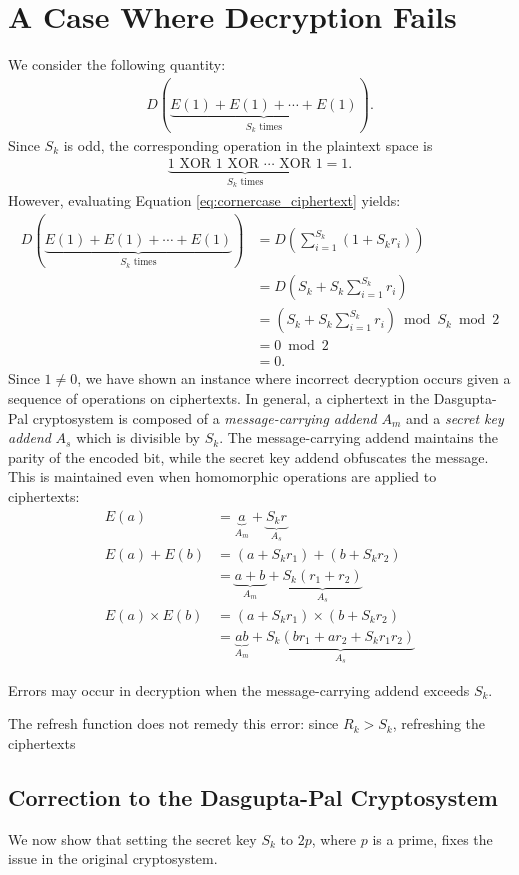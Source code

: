 \section{A Case Where Decryption Fails}
We consider the following quantity:
\begin{align}
	\label{eq:cornercase_ciphertext}
	D(\underbrace{E(1)+E(1)+\cdots+E(1)}_{S_k \text{ times}}).
\end{align}
Since $S_k$ is odd, the corresponding operation in the plaintext space is
\begin{align*}
	\label{eq:cornercase_plaintext}
	\underbrace{1 \text{ XOR } 1 \text{ XOR } \cdots \text{ XOR } 1}_{S_k \text{ times}} = 1.
\end{align*}
However, evaluating Equation \ref{eq:cornercase_ciphertext} yields:
\begin{align*}
	D(\underbrace{E(1)+E(1)+\cdots+E(1)}_{S_k \text{ times}})
	&= D\left(\sum_{i=1}^{S_k}{(1+S_kr_i)}\right)\\
	&= D\left(S_k + S_k\sum_{i=1}^{S_k}{r_i}\right)\\
	&= \left(S_k + S_k\sum_{i=1}^{S_k}{r_i}\right) \bmod S_k \bmod 2\\
	&= 0 \bmod 2\\
	&= 0.
\end{align*}
Since $1\neq 0$, we have shown an instance where incorrect decryption occurs given a sequence of operations on ciphertexts.
In general, a ciphertext in the Dasgupta-Pal cryptosystem is composed of a \textit{message-carrying addend} $A_m$ and a \textit{secret key addend} $A_s$ which is divisible by $S_k$. The message-carrying addend maintains the parity of the encoded bit, while the secret key addend obfuscates the message. This is maintained even when homomorphic operations are applied to ciphertexts:
\begin{align*}
	E(a) &= \underbrace{a}_{A_m} + \underbrace{S_kr}_{A_s}\\
	E(a)+E(b) &= (a + S_kr_1) + (b + S_kr_2)\\
	&= \underbrace{a+b}_{A_m} + \underbrace{S_k(r_1 + r_2)}_{A_s}\\
	E(a)\times E(b) &= (a + S_kr_1) \times (b + S_kr_2)\\
	&= \underbrace{ab}_{A_m} + \underbrace{S_k(br_1 + ar_2 + S_kr_1r_2)}_{A_s}
\end{align*}

Errors may occur in decryption when the message-carrying addend exceeds $S_k$.

The refresh function does not remedy this error: since $R_k > S_k$, refreshing the ciphertexts

\subsection{Correction to the Dasgupta-Pal Cryptosystem}
We now show that setting the secret key $S_k$ to $2p$, where $p$ is a prime, fixes the issue in the original cryptosystem.
